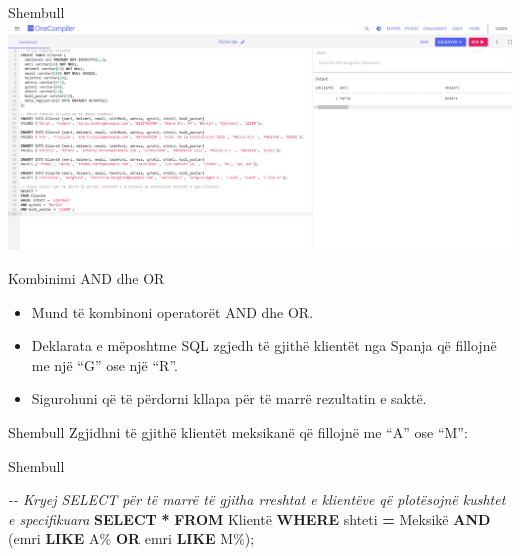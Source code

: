 \documentclass[
  ignorenonframetext,
]{beamer}
\newenvironment{Shaded}{\begin{snugshade}}{\end{snugshade}}
\newcommand{\CommentTok}[1]{\textcolor[rgb]{0.56,0.35,0.01}{\textit{#1}}}
\newcommand{\KeywordTok}[1]{\textcolor[rgb]{0.13,0.29,0.53}{\textbf{#1}}}
\newcommand{\NormalTok}[1]{#1}
\newcommand{\OperatorTok}[1]{\textcolor[rgb]{0.81,0.36,0.00}{\textbf{#1}}}
\newcommand{\StringTok}[1]{\textcolor[rgb]{0.31,0.60,0.02}{#1}}
\begin{document}
\begin{frame}{Shembull}
\label{shembull-25}
\includegraphics{./Figs/query15.png}
\end{frame}

\begin{frame}{Kombinimi AND dhe OR}
\label{kombinimi-and-dhe-or}
\begin{itemize}
\item
  Mund të kombinoni operatorët AND dhe OR.
\item
  Deklarata e mëposhtme SQL zgjedh të gjithë klientët nga Spanja që
  fillojnë me një ``G'' ose një ``R''.
\item
  Sigurohuni që të përdorni kllapa për të marrë rezultatin e saktë.
\end{itemize}
\end{frame}

\begin{frame}{Shembull}
\label{shembull-26}
Zgjidhni të gjithë klientët meksikanë që fillojnë me ``A'' ose ``M'':
\end{frame}

\begin{frame}[fragile]{Shembull}
\label{shembull-27}

\begin{Shaded}
\begin{Highlighting}[]
\CommentTok{{-}{-} Kryej SELECT për të marrë të gjitha rreshtat e klientëve që plotësojnë kushtet e specifikuara}
\KeywordTok{SELECT} \OperatorTok{*} 
\KeywordTok{FROM}\NormalTok{ Klientë}
\KeywordTok{WHERE}\NormalTok{ shteti }\OperatorTok{=} \StringTok{\textquotesingle{}Meksikë\textquotesingle{}}
\KeywordTok{AND}\NormalTok{ (emri }\KeywordTok{LIKE} \StringTok{\textquotesingle{}A\%\textquotesingle{}} \KeywordTok{OR}\NormalTok{ emri }\KeywordTok{LIKE} \StringTok{\textquotesingle{}M\%\textquotesingle{}}\NormalTok{);}
\end{Highlighting}
\end{Shaded}
\end{frame}
\end{document}
